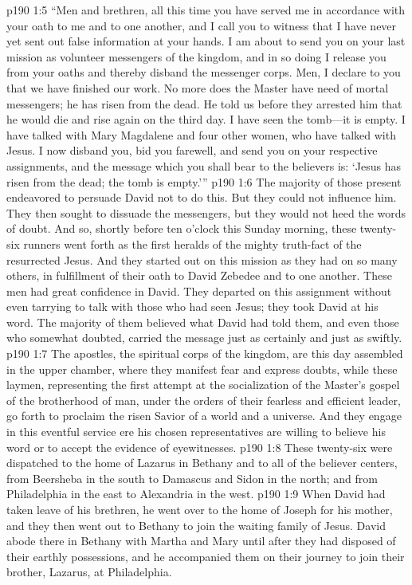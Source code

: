 \pc \vs p190 1:5 “Men and brethren, all this time you have served me in accordance with your oath to me and to one another, and I call you to witness that I have never yet sent out false information at your hands. I am about to send you on your last mission as volunteer messengers of the kingdom, and in so doing I release you from your oaths and thereby disband the messenger corps. Men, I declare to you that we have finished our work. No more does the Master have need of mortal messengers; he has risen from the dead. He told us before they arrested him that he would die and rise again on the third day. I have seen the tomb---it is empty. I have talked with Mary Magdalene and four other women, who have talked with Jesus. I now disband you, bid you farewell, and send you on your respective assignments, and the message which you shall bear to the believers is: ‘Jesus has risen from the dead; the tomb is empty.’”
\pc \vs p190 1:6 The majority of those present endeavored to persuade David not to do this. But they could not influence him. They then sought to dissuade the messengers, but they would not heed the words of doubt. And so, shortly before ten o’clock this Sunday morning, these twenty\hyp{}six runners went forth as the first heralds of the mighty truth\hyp{}fact of the resurrected Jesus. And they started out on this mission as they had on so many others, in fulfillment of their oath to David Zebedee and to one another. These men had great confidence in David. They departed on this assignment without even tarrying to talk with those who had seen Jesus; they took David at his word. The majority of them believed what David had told them, and even those who somewhat doubted, carried the message just as certainly and just as swiftly.
\pc \vs p190 1:7 The apostles, the spiritual corps of the kingdom, are this day assembled in the upper chamber, where they manifest fear and express doubts, while these laymen, representing the first attempt at the socialization of the Master’s gospel of the brotherhood of man, under the orders of their fearless and efficient leader, go forth to proclaim the risen Savior of a world and a universe. And they engage in this eventful service ere his chosen representatives are willing to believe his word or to accept the evidence of eyewitnesses.
\pc \vs p190 1:8 These twenty\hyp{}six were dispatched to the home of Lazarus in Bethany and to all of the believer centers, from Beersheba in the south to Damascus and Sidon in the north; and from Philadelphia in the east to Alexandria in the west.
\vs p190 1:9 When David had taken leave of his brethren, he went over to the home of Joseph for his mother, and they then went out to Bethany to join the waiting family of Jesus. David abode there in Bethany with Martha and Mary until after they had disposed of their earthly possessions, and he accompanied them on their journey to join their brother, Lazarus, at Philadelphia.\plusone
